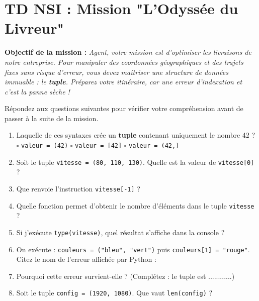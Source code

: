 \section*{TD NSI :  Mission "L'Odyssée du Livreur"}

\textbf{Objectif de la mission :} \textit{Agent, votre mission est d'optimiser les livraisons de notre entreprise. Pour manipuler des coordonnées géographiques et des trajets fixes sans risque d'erreur, vous devez maîtriser une structure de données immuable : le \textbf{tuple}. Préparez votre itinéraire, car une erreur d'indexation et c'est la panne sèche !} 


\begin{Exercise}[title={Maîtrise des Tuples : Les fondamentaux }]
Répondez aux questions suivantes pour vérifier votre compréhension avant de passer à la suite de la mission.

\begin{enumerate}
    \item  Laquelle de ces syntaxes crée un \textbf{tuple} contenant uniquement le nombre 42 ?\\
    \hfill $\square$ \texttt{valeur = (42)} \hfill $\square$ \texttt{valeur = [42]} \hfill $\square$ \texttt{valeur = (42,)} \hfill

    
    \item  Soit le tuple \texttt{vitesse = (80, 110, 130)}. Quelle est la valeur de \texttt{vitesse[0]} ? \dotfill
    
    \item  Que renvoie l'instruction \texttt{vitesse[-1]} ? \dotfill
    
    \item  Quelle fonction permet d'obtenir le nombre d'éléments dans le tuple \texttt{vitesse} ? \dotfill
    
    \item  Si j'exécute \texttt{type(vitesse)}, quel résultat s'affiche dans la console ? \dotfill

    \item  On exécute : \texttt{couleurs = ("bleu", "vert")} puis \texttt{couleurs[1] = "rouge"}. 
    Citez le nom de l'erreur affichée par Python : \dotfill
    
    \item  Pourquoi cette erreur survient-elle ? (Complétez : le tuple est ............) \dotfill

    \item  Soit le tuple \texttt{config = (1920, 1080)}. Que vaut \texttt{len(config)} ? \dotfill
    

\end{enumerate}
\end{Exercise}

